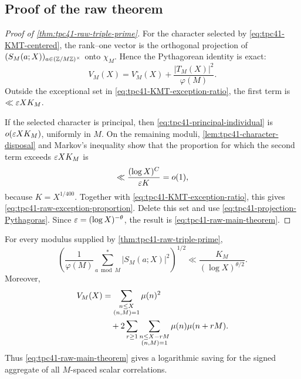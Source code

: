 \subsection{Proof of the raw theorem}

\begin{proof}[Proof of \cref{thm:tpc41-raw-triple-prime}]
For the character selected by
\eqref{eq:tpc41-KMT-centered}, the rank--one vector is the orthogonal
projection of \((S_M(a;X))_{a\in(\mathbb Z/M\mathbb Z)^\times}\) onto \(\chi_M\).
Hence the Pythagorean identity is exact:
\begin{equation}
 V_M(X)
 =V_M^\circ(X)+\frac{|T_M(X)|^2}{\varphi(M)}.
 \label{eq:tpc41-projection-Pythagoras}
\end{equation}
Outside the exceptional set in
\eqref{eq:tpc41-KMT-exception-ratio}, the first term is
\(\ll\varepsilon XK_M\).

If the selected character is principal, then
\eqref{eq:tpc41-principal-individual} is \(o(\varepsilon XK_M)\), uniformly in
\(M\).  On the remaining moduli,
\cref{lem:tpc41-character-disposal} and Markov's inequality show that the
proportion for which the second term exceeds \(\varepsilon XK_M\) is
\begin{equation}
 \ll\frac{(\log X)^C}{\varepsilon K}=o(1),
 \label{eq:tpc41-character-Markov}
\end{equation}
because \(K=X^{1/400}\).  Together with
\eqref{eq:tpc41-KMT-exception-ratio}, this gives
\eqref{eq:tpc41-raw-exception-proportion}.  Delete this set and use
\eqref{eq:tpc41-projection-Pythagoras}.  Since
\(\varepsilon=(\log X)^{-\theta}\), the result is
\eqref{eq:tpc41-raw-main-theorem}.
\end{proof}

\begin{corollary}
\label{cor:tpc41-RMS-moving-shift}
For every modulus supplied by
\cref{thm:tpc41-raw-triple-prime},
\begin{equation}
 \left(
  \frac1{\varphi(M)}\sum_{a\bmod M}^{*}|S_M(a;X)|^2
 \right)^{1/2}
 \ll\frac{K_M}{(\log X)^{\theta/2}}.
 \label{eq:tpc41-RMS}
\end{equation}
Moreover,
\begin{align}
 V_M(X)
 &=\sum_{\substack{n\le X\\(n,M)=1}}\mu(n)^2
 \notag\\
 &\quad+2\sum_{r\ge1}
 \sum_{\substack{n\le X-rM\\(n,M)=1}}
 \mu(n)\mu(n+rM).
 \label{eq:tpc41-moving-correlation-identity}
\end{align}
Thus \eqref{eq:tpc41-raw-main-theorem} gives a logarithmic saving for the
signed aggregate of all \(M\)-spaced scalar correlations.
\end{corollary}

